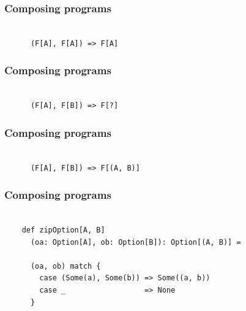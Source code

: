 \documentclass{beamer}
\begin{document}
\begin{frame}[fragile]

  \frametitle{Composing programs}

  \centering
  \LARGE

  \begin{minipage}{0.85\textwidth}
    \begin{verbatim}

      (F[A], F[A]) => F[A]

    \end{verbatim}
  \end{minipage}

\end{frame}

\begin{frame}[fragile]

  \frametitle{Composing programs}

  \centering
  \LARGE

  \begin{minipage}{0.85\textwidth}
    \begin{verbatim}

      (F[A], F[B]) => F[?]

    \end{verbatim}
  \end{minipage}

\end{frame}

\begin{frame}[fragile]

  \frametitle{Composing programs}

  \centering
  \LARGE

  \begin{minipage}{1.0\textwidth}
    \begin{verbatim}

      (F[A], F[B]) => F[(A, B)]

    \end{verbatim}
  \end{minipage}

\end{frame}

\begin{frame}[fragile]

  \frametitle{Composing programs}

  \begin{verbatim}

    def zipOption[A, B]
      (oa: Option[A], ob: Option[B]): Option[(A, B)] =

      (oa, ob) match {
        case (Some(a), Some(b)) => Some((a, b))
        case _                  => None
      }

  \end{verbatim}

\end{frame}
\end{document}

